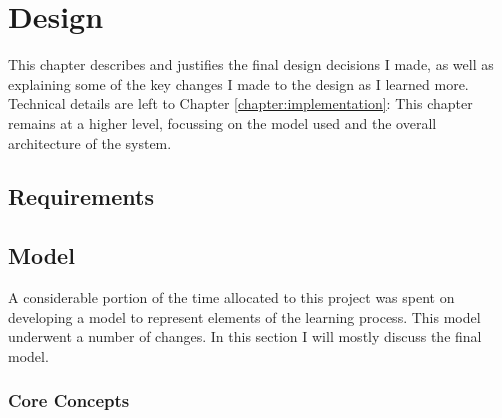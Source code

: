 \chapter{Design}
\label{chapter:design}
  This chapter describes and justifies the final design decisions I made, as well as explaining some of the key changes I made to the design as I learned more. Technical details are left to Chapter \ref{chapter:implementation}: This chapter remains at a higher level, focussing on the model used and the overall architecture of the system.

  \section{Requirements}

  \section{Model}
    A considerable portion of the time allocated to this project was spent on developing a model to represent elements of the learning process. This model underwent a number of changes. In this section I will mostly discuss the final model.

    \subsection{Core Concepts}

